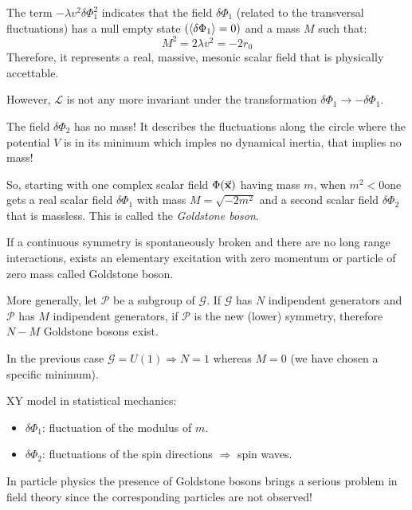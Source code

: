 \documentclass[../main/main.tex]{subfiles}
\begin{document}
\begin{remark}
The term \( - \lambda v^2 \delta \Phi _1^2 \) indicates that the field \( \delta \Phi _1 \) (related to the transversal fluctuations) has a null empty state \( ( \expval{\delta \Phi _1}= 0 ) \) and a mass \( M \) such that:
\begin{equation}
  M^2 = 2 \lambda v^2 = - 2 r_0
\end{equation}
Therefore, it represents a real, massive, mesonic scalar field that is physically accettable.

However, \( \mathcal{L} \) is not any more invariant under the transformation \( \delta \Phi _1 \rightarrow - \delta \Phi _1 \).
\end{remark}
\begin{remark}
The field \( \delta \Phi _2 \) has no mass! It describes the fluctuations along the circle where the potential \( V \) is in its minimum  which imples no dynamical inertia, that implies no mass!
\end{remark}
So, starting with one complex scalar field \( \Phi (\va{x}) \) having mass \( m \), when \( m^2 < 0 \)one gets a real scalar field \( \delta \Phi _1 \) with mass \( M = \sqrt{- 2 m^2}  \)  and a second scalar field \( \delta \Phi _2 \) that is massless. This is called the \emph{Goldstone boson}.
\begin{theorem}{}{}
If a continuous symmetry is spontaneously broken and there are no long range interactions, exists an elementary excitation with zero momentum or particle of zero mass called Goldstone boson.
\end{theorem}
More generally, let \( \mathcal{P} \) be a subgroup of \( \mathcal{G} \). If \( \mathcal{G} \) has \( N \) indipendent generators and \( \mathcal{P} \)  has \( M \) indipendent generators, if \( \mathcal{P} \) is the new (lower) symmetry, therefore \( N-M \)  Goldstone bosons exist.

In the previous case \( \mathcal{G} = U (1)  \Rightarrow  N=1\) whereas \( M=0 \) (we have chosen a specific minimum).
\begin{example}{}{}
XY model in statistical mechanics:
\begin{itemize}
\item \( \delta \Phi _1 \): fluctuation of the modulus of \( m \).
\item \( \delta \Phi _2 \): fluctuations of the spin directions \( \Rightarrow  \) spin waves.
\end{itemize}
\end{example}
\begin{remark}
In particle physics the presence of Goldstone bosons brings a serious problem in field theory since the corresponding particles are not observed!
\end{remark}
\end{document}
